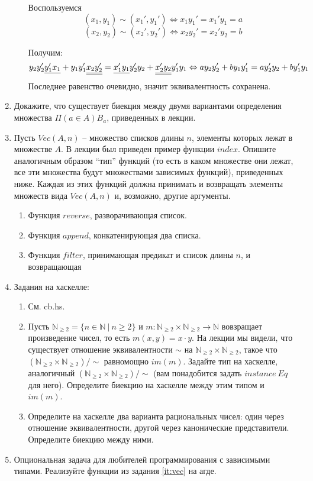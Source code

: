 \begin{enumerate}
\begin{enumerate}
 Воспользуемся 
 $$(x_1,y_1) \sim (x_1',y_1') \Leftrightarrow x_1y_1' = x_1'y_1 = a$$
 $$(x_2,y_2) \sim (x_2',y_2') \Leftrightarrow x_2y_2' = x_2'y_2 = b$$
 
 Получим: 
 $$ y_2 y_2' \underline{y_1'x_1} +  y_1  y_1' \underline{\underline{x_2y_2'}} 
 = \underline{x_1'y_1}  y_2' y_2 + \underline{\underline{x_2'y_2}}  y_1'  y_1 \Leftrightarrow 
 a y_2 y_2' + b y_1  y_1' = a y_2' y_2 + b y_1'  y_1 $$
Последнее равенство очевидно, значит эквивалентность сохранена.

\end{enumerate}

\item Докажите, что существует биекция между двумя вариантами определения множества $\Pi (a \in A) B_a$, приведенных в лекции.

\item \label{it:vec}
    Пусть $Vec(A,n)$ -- множество списков длины $n$, элементы которых лежат в множестве $A$.
    В лекции был приведен пример функции $index$.
    Опишите аналогичным образом ``тип'' функций (то есть в каком множестве они лежат, все эти множества будут множествами зависимых функций), приведенных ниже.
    Каждая из этих функций должна принимать и возвращать элементы множеств вида $Vec(A,n)$ и, возможно, другие аргументы.
\begin{enumerate}
\item Функция $reverse$, разворачивающая список.
\item Функция $append$, конкатенирующая два списка.
\item Функция $filter$, принимающая предикат и список длины $n$, и возвращающая
\end{enumerate}

\item Задания на хаскелле:
\begin{enumerate}
\item См. cb.hs.
\item Пусть $\mathbb{N}_{\geq 2} = \{ n \in \mathbb{N}\ |\ n \geq 2 \}$ и $m : \mathbb{N}_{\geq 2} \times \mathbb{N}_{\geq 2} \to \mathbb{N}$ вовзращает произведение чисел, то есть $m(x,y) = x \cdot y$.
    На лекции мы видели, что существует отношение эквивалентности $\sim$ на $\mathbb{N}_{\geq 2} \times \mathbb{N}_{\geq 2}$, такое что $(\mathbb{N}_{\geq 2} \times \mathbb{N}_{\geq 2})/\!\!\sim$ равномощно $im(m)$.
    Задайте тип на хаскелле, аналогичный $(\mathbb{N}_{\geq 2} \times \mathbb{N}_{\geq 2})/\!\!\sim$ (вам понадобится задать $instance\ Eq$ для него).
    Определите биекцию на хаскелле между этим типом и $im(m)$.
\item
{
    Определите на хаскелле два варианта рациональных чисел: один через отношение эквивалентности, другой через канонические представители.
}
    Определите биекцию между ними.
\end{enumerate}

\item Опциональная задача для любителей программирования с зависимыми типами. Реализуйте функции из задания \ref{it:vec} на агде.

\end{enumerate}


